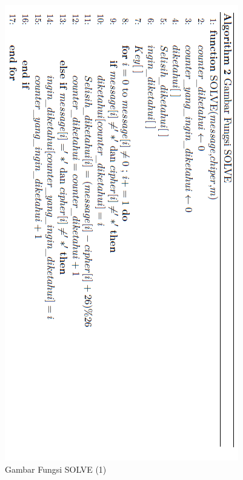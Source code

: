   \begin{figure}[H]
		\centering
		\includegraphics[scale=0.62]{images/bab3/solvefx1.png}
		\caption{Gambar Fungsi SOLVE (1)}
		\label{fig:solvefx}
	\end{figure}
